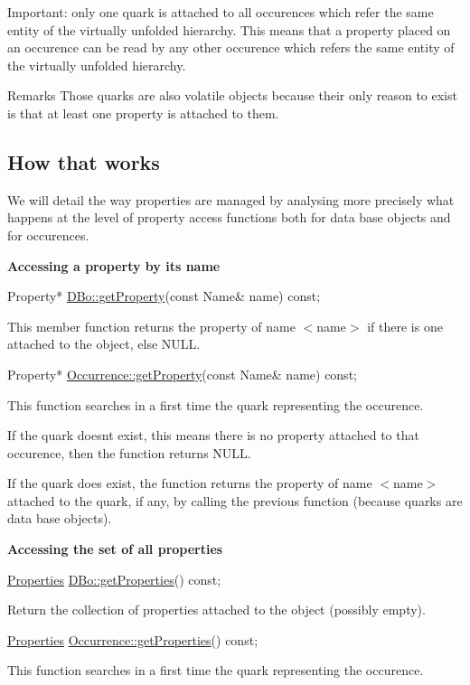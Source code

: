 \begin{DoxyParagraph}{Important\+: only one quark is attached to all occurences which refer the }
same entity of the virtually unfolded hierarchy. This means that a property placed on an occurence can be read by any other occurence which refers the same entity of the virtually unfolded hierarchy.
\end{DoxyParagraph}
\begin{DoxyRemark}{Remarks}
Those quarks are also volatile objects because their only reason to exist is that at least one property is attached to them.
\end{DoxyRemark}
\hypertarget{classHurricane_1_1Property_secPropertyHowThatWorks}{}\subsection{How that works}\label{classHurricane_1_1Property_secPropertyHowThatWorks}
We will detail the way properties are managed by analysing more precisely what happens at the level of property access functions both for data base objects and for occurences.

{\bfseries Accessing a property by its name} 
\begin{DoxyCode}
Property* \mbox{\hyperlink{classHurricane_1_1DBo_a599f61978df51d1d4c351f6cbd02488d}{DBo::getProperty}}(\textcolor{keyword}{const} Name& name) \textcolor{keyword}{const};
\end{DoxyCode}
 This member function returns the property of name {\ttfamily $<$name$>$} if there is one attached to the object, else N\+U\+LL. 
\begin{DoxyCode}
Property* \mbox{\hyperlink{classHurricane_1_1Occurrence_ab2b36b219037a2310f6527a35a9a266f}{Occurrence::getProperty}}(\textcolor{keyword}{const} Name& name) \textcolor{keyword}{const};
\end{DoxyCode}
 This function searches in a first time the quark representing the occurence.

If the quark doesn\textquotesingle{}t exist, this means there is no property attached to that occurence, then the function returns N\+U\+LL.

If the quark does exist, the function returns the property of name {\ttfamily $<$name$>$} attached to the quark, if any, by calling the previous function (because quarks are data base objects).

{\bfseries Accessing the set of all properties} 
\begin{DoxyCode}
\mbox{\hyperlink{namespaceHurricane_afd7bca6dad4be54b7c03b0463e6c0004}{Properties}}  \mbox{\hyperlink{classHurricane_1_1DBo_aec46894a10e83abb54c495dc4d90f2d3}{DBo::getProperties}}() \textcolor{keyword}{const};
\end{DoxyCode}
 Return the collection of properties attached to the object (possibly empty). 
\begin{DoxyCode}
\mbox{\hyperlink{namespaceHurricane_afd7bca6dad4be54b7c03b0463e6c0004}{Properties}}  \mbox{\hyperlink{classHurricane_1_1Occurrence_acbf59d6c01804e01f66d076c149abb49}{Occurrence::getProperties}}() \textcolor{keyword}{const};
\end{DoxyCode}
 This function searches in a first time the quark representing the occurence.

